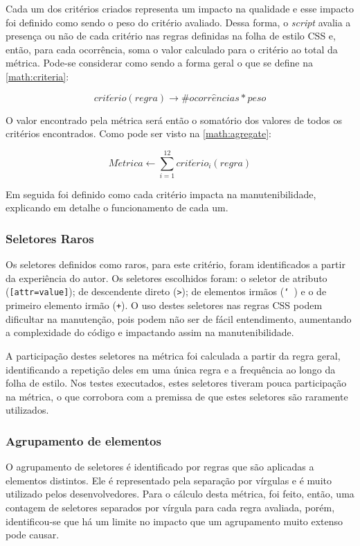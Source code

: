 Cada um dos critérios criados representa um impacto na qualidade e esse impacto foi definido como sendo o peso do critério avaliado. Dessa forma, o \textit{script} avalia a presença ou não de cada critério nas regras definidas na folha de estilo CSS e, então, para cada ocorrência, soma o valor calculado para o critério ao total da métrica. Pode-se considerar como sendo a forma geral o que se define na \autoref{math:criteria}:

\begin{equation}
\label{math:criteria}
	crit\acute{e}rio(regra) \rightarrow \# ocorr\hat{e}ncias * peso
\end{equation}

O valor encontrado pela métrica será então o somatório dos valores de todos os critérios encontrados. Como pode ser visto na \autoref{math:agregate}:

\begin{equation}
\label{math:agregate}
	M\acute{e}trica \leftarrow \displaystyle\sum_{i=1}^{12} crit\acute{e}rio_i(regra)
\end{equation}

Em seguida foi definido como cada critério impacta na manutenibilidade, explicando em detalhe o funcionamento de cada um.

\subsubsection{Seletores Raros}
Os seletores definidos como raros, para este critério, foram identificados a partir da experiência do autor. Os seletores escolhidos foram: o seletor de atributo (\texttt{[attr=value]}); de descendente direto (\texttt{>}); de elementos irmãos (\texttt{\char`~}) e o de primeiro elemento irmão (\texttt{+}). O uso destes seletores nas regras CSS podem dificultar na manutenção, pois podem não ser de fácil entendimento, aumentando a complexidade do código e impactando assim na manutenibilidade.

A participação destes seletores na métrica foi calculada a partir da regra geral, identificando a repetição deles em uma única regra e a frequência ao longo da folha de estilo. Nos testes executados, estes seletores tiveram pouca participação na métrica, o que corrobora com a premissa de que estes seletores são raramente utilizados.

\subsubsection{Agrupamento de elementos}
O agrupamento de seletores é identificado por regras que são aplicadas a elementos distintos. Ele é representado pela separação por vírgulas e é muito utilizado pelos desenvolvedores. Para o cálculo desta métrica, foi feito, então, uma contagem de seletores separados por vírgula para cada regra avaliada, porém, identificou-se que há um limite no impacto que um agrupamento muito extenso pode causar. 

